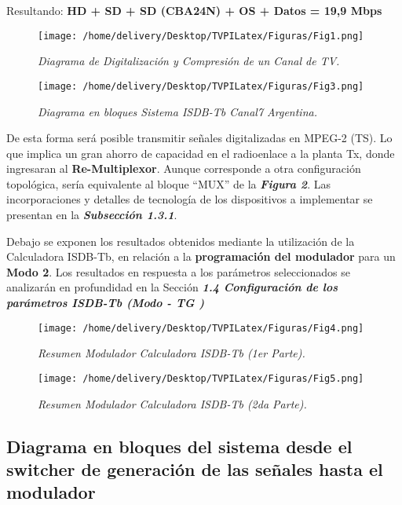 \documentclass[a4paper,11pt]{article} %
\begin{document}
Resultando: \textbf{HD + SD + SD (CBA24N) + OS + Datos = 19,9 Mbps}

\begin{figure}[h!] 
\centering
\texttt{[image: /home/delivery/Desktop/TVPILatex/Figuras/Fig1.png]}
\caption{\emph{Diagrama de Digitalizaci\'on y Compresi\'on de un Canal
de TV.}}
\end{figure} 

\begin{figure}[h!] 
\centering
\texttt{[image: /home/delivery/Desktop/TVPILatex/Figuras/Fig3.png]}
\caption{\emph{Diagrama en bloques Sistema ISDB-Tb Canal7 Argentina.}}
\end{figure}

\newpage
De esta forma ser\'a posible transmitir se\~nales digitalizadas en
MPEG-2 (TS). Lo que implica un gran ahorro de capacidad en el
radioenlace a la planta Tx, donde ingresaran al
\textbf{Re-Multiplexor}. Aunque corresponde a otra configuraci\'on
topol\'ogica, ser\'ia equivalente al bloque ``MUX'' de la
\textbf{\emph{Figura 2}}. Las incorporaciones y detalles de
tecnolog\'ia de los dispositivos a implementar se presentan en la
\textbf{\emph{Subsecci\'on 1.3.1}}. 

\newpage
Debajo se exponen los resultados obtenidos mediante la
utilizaci\'on de la Calculadora ISDB-Tb, en relaci\'on a la
\textbf{programaci\'on del modulador} para un \textbf{Modo 2}. Los
resultados en respuesta a los par\'ametros seleccionados se analizar\'an
en profundidad en la Secci\'on \textbf{\emph{1.4 Configuración de los
parámetros ISDB-Tb (Modo - TG )}} 

\begin{figure}[h!] 
\centering
\texttt{[image: /home/delivery/Desktop/TVPILatex/Figuras/Fig4.png]}
\caption{\emph{Resumen Modulador Calculadora ISDB-Tb (1er Parte).}}
\end{figure}

\begin{figure}[h!] 
\centering
\texttt{[image: /home/delivery/Desktop/TVPILatex/Figuras/Fig5.png]}
\caption{\emph{Resumen Modulador Calculadora ISDB-Tb (2da Parte).}}
\end{figure}  

  

\newpage
\subsection{Diagrama en bloques del sistema desde el switcher de
generación de las señales hasta el modulador}
\end{document}
